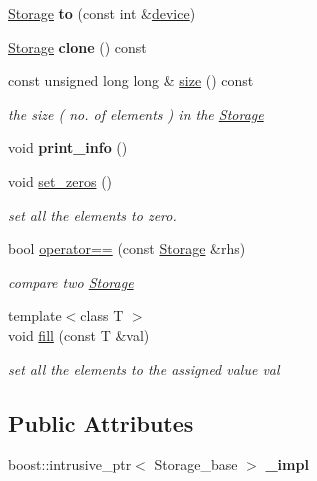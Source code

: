 \begin{DoxyCompactItemize}
\hyperlink{classcytnx_1_1Storage}{Storage} {\bfseries to} (const int \&\hyperlink{classcytnx_1_1Storage_a4c3e27582d7f951e6b76ccbb92f7c537}{device})
\item 
\mbox{\label{classcytnx_1_1Storage_aed0530dd20f3fb352d45653ba46a3d50}} 
\hyperlink{classcytnx_1_1Storage}{Storage} {\bfseries clone} () const
\item 
const unsigned long long \& \hyperlink{classcytnx_1_1Storage_aaf36262622abdab03c90b713c454f78e}{size} () const
\begin{DoxyCompactList}\small\item\em the size ( no. of elements ) in the \hyperlink{classcytnx_1_1Storage}{Storage} \end{DoxyCompactList}\item 
\mbox{\label{classcytnx_1_1Storage_a0ae2bee5e15c651b05dadf5dbbdb36f5}} 
void {\bfseries print\+\_\+info} ()
\item 
void \hyperlink{classcytnx_1_1Storage_a7e854529c99108b0acc3e5e2b185244b}{set\+\_\+zeros} ()
\begin{DoxyCompactList}\small\item\em set all the elements to zero. \end{DoxyCompactList}\item 
bool \hyperlink{classcytnx_1_1Storage_ad304e00cf3d472ea0355af6b40c4529d}{operator==} (const \hyperlink{classcytnx_1_1Storage}{Storage} \&rhs)
\begin{DoxyCompactList}\small\item\em compare two \hyperlink{classcytnx_1_1Storage}{Storage} \end{DoxyCompactList}\item 
{\footnotesize template$<$class T $>$ }\\void \hyperlink{classcytnx_1_1Storage_a48f0424f051a4b3a821eb964be4cd5db}{fill} (const T \&val)
\begin{DoxyCompactList}\small\item\em set all the elements to the assigned value val \end{DoxyCompactList}\end{DoxyCompactItemize}
\subsection*{Public Attributes}
\begin{DoxyCompactItemize}
\item 
\mbox{\label{classcytnx_1_1Storage_a41588ac45db0467c4e277bc4e572908a}} 
boost\+::intrusive\+\_\+ptr$<$ Storage\+\_\+base $>$ {\bfseries \+\_\+impl}
\end{DoxyCompactItemize}


